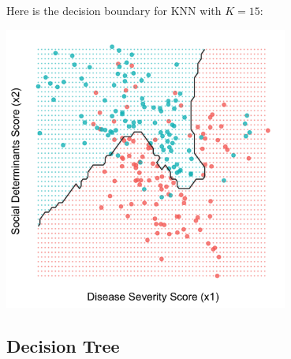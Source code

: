 \noindent Here is the decision boundary for KNN with $K=15$:
\begin{center}
\includegraphics[width=0.7\textwidth]{img/esl-knn-15.png}
\end{center}

\subsection{Decision Tree}

